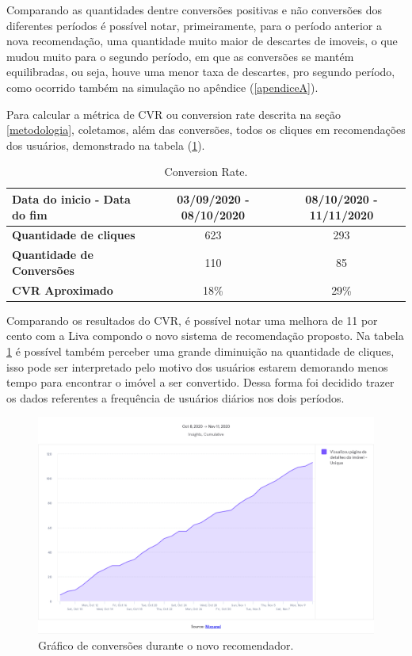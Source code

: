 Comparando as quantidades dentre conversões positivas e não conversões dos diferentes períodos é possível notar, primeiramente, para o período anterior a nova recomendação, uma quantidade muito maior de descartes de imoveis, o que mudou muito para o segundo período, em que as conversões se mantém equilibradas, ou seja, houve uma menor taxa de descartes, pro segundo período, como ocorrido também na simulação no apêndice (\ref{apendiceA}).

Para calcular a métrica de CVR ou conversion rate descrita na seção \ref{metodologia}, coletamos, além das conversões, todos os cliques em recomendações dos usuários, demonstrado na tabela (\ref{tab:my-table3}).

\begin{table}[H]
\centering
\caption[Conversion Rate]{Conversion Rate.}
\begin{tabular}{lcc}
\hline
\textbf{Data do inicio - Data do fim} & 03/09/2020 - 08/10/2020 & 08/10/2020 - 11/11/2020 \\ \hline
\textbf{Quantidade de cliques} & 623 & 293 \\ \hline
\textbf{Quantidade de Conversões} & 110 & 85 \\ \hline
\textbf{CVR Aproximado} & 18\% & 29\% \\ \hline
\end{tabular}
\label{tab:my-table3}
\end{table}

Comparando os resultados do CVR, é possível notar uma melhora de 11 por cento com a Liva compondo o novo sistema de recomendação proposto. Na tabela \ref{tab:my-table3} é possível também perceber uma grande diminuição na quantidade de cliques, isso pode ser interpretado pelo motivo dos usuários estarem demorando menos tempo para encontrar o imóvel a ser convertido. Dessa forma foi decidido trazer os dados referentes a frequência de usuários diários nos dois períodos.

\begin{figure}[H]
    \centering
    \includegraphics[scale=0.35]{figuras/desenvolvimento/mixpanel-antes.png}
    \caption[Gráfico de conversões durante o novo recomendador]{Gráfico de conversões durante o novo recomendador.}
    \label{fig:mixpanel-antes}
\end{figure}

